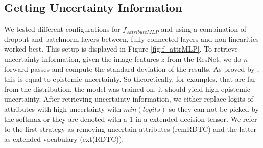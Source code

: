 \documentclass[a4paper,cleardoubleempty,BCOR1cm, 11pt]{report}
\begin{document}
\subsection{Getting Uncertainty Information}
We tested different configurations for $f_{AttributeMLP}$ and using a combination of dropout and batchnorm layers between, fully connected layers and non-linearities worked best. This setup is displayed in Figure \ref{fig:f_attrMLP}. To retrieve uncertainty information, given the image features $z$ from the ResNet, we do $n$ forward passes and compute the standard deviation of the results. As proved by \citet{gal2016dropout}, this is equal to epistemic uncertainty. So theoretically, for examples, that are far from the distribution, the model was trained on, it should yield high epistemic uncertainty. 
After retrieving uncertainty information, we either replace logits of attributes with high uncertainty with $min(logits)$ so they can not be picked by the softmax or they are denoted with a $1$ in a extended decision tensor. We refer to the first strategy as removing uncertain attributes (remRDTC) and the latter as extended vocabulary (ext(RDTC)).
\end{document}
